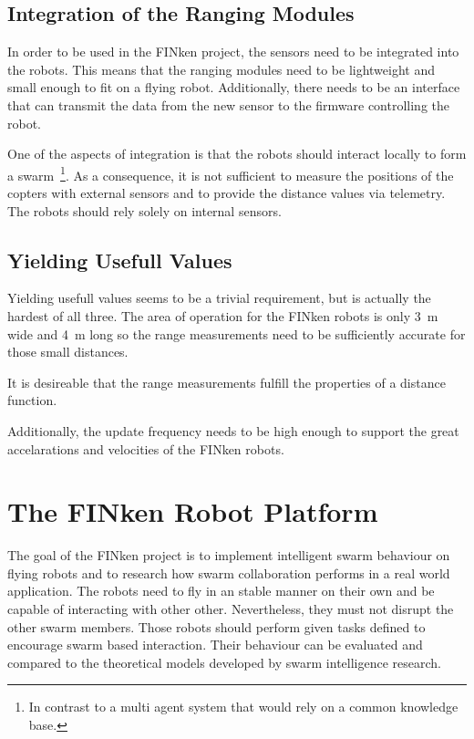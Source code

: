 \subsection{Integration of the Ranging Modules}
\label{req2}
In order to be used in the FINken project, the sensors need to be integrated into the robots.
This means that the ranging modules need to be lightweight and small enough to fit on a flying robot.
Additionally, there needs to be an interface that can transmit the data from the new sensor to the firmware controlling the robot.

One of the aspects of integration is that the robots should interact locally to form a swarm~\cite{swarm1}\footnote{
In contrast to a multi agent system that would rely on a common knowledge base.}.
As a consequence, it is not sufficient to measure the positions of the copters with external sensors and to provide the distance values via telemetry. The robots should rely solely on internal sensors.

\subsection{Yielding Usefull Values}
\label{req3}
Yielding usefull values seems to be a trivial requirement, but is actually the hardest of all three.
The area of operation for the FINken robots is only \SI{3}{m} wide and \SI{4}{m} long so the range measurements need to be sufficiently accurate for those small distances.

It is desireable that the range measurements fulfill the properties of a distance function.

Additionally, the update frequency needs to be high enough to support the great accelarations and velocities of the FINken robots.


\section{The FINken Robot Platform}


The goal of the FINken project is to implement intelligent swarm behaviour on flying robots and to research how swarm collaboration performs in a real world application.
The robots need to fly in an stable manner on their own and be capable of interacting with other other.
Nevertheless, they must not disrupt the other swarm members.
Those robots should perform given tasks defined to encourage swarm based interaction.
Their behaviour can be evaluated and compared to the theoretical models developed by swarm intelligence research.

